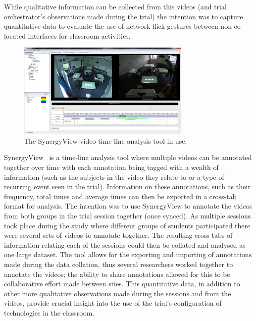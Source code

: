 \documentclass[a4paper,11pt]{article}
\begin{document}

While qualitative information can be collected from this videos (and trial orchestrator's observations made during the trial) the intention was to capture quantitative data to evaluate the use of network flick gestures between non-co-located interfaces for classroom activities.

\begin{figure}[h]
 \centering
   \includegraphics[width=0.75\textwidth]{figures/synergyviewexample.png}
   \caption{The SynergyView video time-line analysis tool in use.}
   \label{fig:SynergyviewExample}
\end{figure}

SynergyView~\cite{kyaw:2010} is a time-line analysis tool where multiple videos can be annotated together over time with each annotation being tagged with a wealth of information (such as the subjects in the video they relate to or a type of recurring event seen in the trial).
Information on these annotations, such as their frequency, total times and average times can then be exported in a cross-tab format for analysis.
The intention was to use SynergyView to annotate the videos from both groups in the trial session together (once synced).
As multiple sessions took place during the study where different groups of students participated there were several sets of videos to annotate together.
The resulting cross-tabs of information relating each of the sessions could then be collated and analysed as one large dataset.
The tool allows for the exporting and importing of annotations made during the data collation, thus several researchers worked together to annotate the videos; the ability to share annotations allowed for this to be collaborative effort made between sites. 
This quantitative data, in addition to other more qualitative observations made during the sessions and from the videos, provide crucial insight into the use of the trial's configuration of technologies in the classroom.
\end{document}
